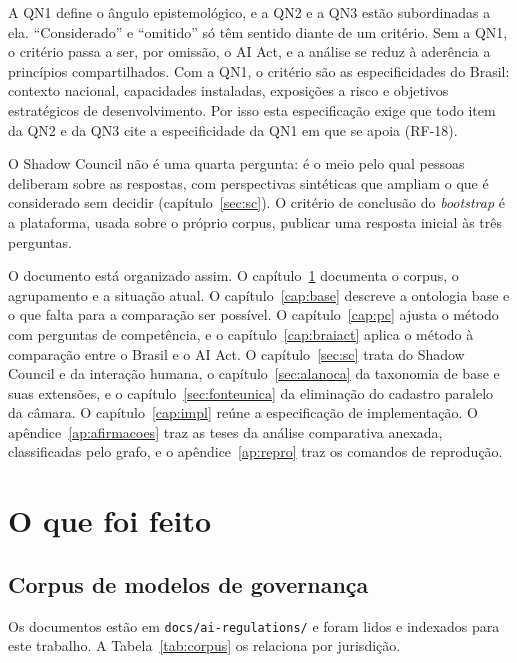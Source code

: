 \documentclass[12pt,a4paper,oneside,english,brazil]{abntex2}
\begin{document}
A QN1 define o ângulo epistemológico, e a QN2 e a QN3 estão subordinadas a ela. ``Considerado'' e ``omitido'' só têm sentido diante de um critério. Sem a QN1, o critério passa a ser, por omissão, o AI Act, e a análise se reduz à aderência a princípios compartilhados. Com a QN1, o critério são as especificidades do Brasil: contexto nacional, capacidades instaladas, exposições a risco e objetivos estratégicos de desenvolvimento. Por isso esta especificação exige que todo item da QN2 e da QN3 cite a especificidade da QN1 em que se apoia (RF-18).

O Shadow Council não é uma quarta pergunta: é o meio pelo qual pessoas deliberam sobre as respostas, com perspectivas sintéticas que ampliam o que é considerado sem decidir (capítulo~\ref{sec:sc}). O critério de conclusão do \emph{bootstrap} é a plataforma, usada sobre o próprio corpus, publicar uma resposta inicial às três perguntas.


O documento está organizado assim. O capítulo~\ref{cap:feito} documenta o corpus, o agrupamento e a situação atual. O capítulo~\ref{cap:base} descreve a ontologia base e o que falta para a comparação ser possível. O capítulo~\ref{cap:pc} ajusta o método com perguntas de competência, e o capítulo~\ref{cap:braiact} aplica o método à comparação entre o Brasil e o AI Act. O capítulo~\ref{sec:sc} trata do Shadow Council e da interação humana, o capítulo~\ref{sec:alanoca} da taxonomia de base e suas extensões, e o capítulo~\ref{sec:fonteunica} da eliminação do cadastro paralelo da câmara. O capítulo~\ref{cap:impl} reúne a especificação de implementação. O apêndice~\ref{ap:afirmacoes} traz as teses da análise comparativa anexada, classificadas pelo grafo, e o apêndice~\ref{ap:repro} traz os comandos de reprodução.

\chapter{O que foi feito}\label{cap:feito}

\section{Corpus de modelos de governança}
Os documentos estão em \texttt{docs/ai-regulations/} e foram lidos e indexados para este trabalho. A Tabela~\ref{tab:corpus} os relaciona por jurisdição.
\end{document}

